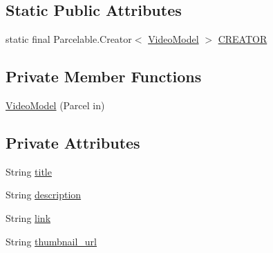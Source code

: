 \subsection*{Static Public Attributes}
\begin{DoxyCompactItemize}
\item 
static final Parcelable.\+Creator$<$ \hyperlink{classorg_1_1buildmlearn_1_1toolkit_1_1videocollectiontemplate_1_1data_1_1VideoModel}{Video\+Model} $>$ \hyperlink{classorg_1_1buildmlearn_1_1toolkit_1_1videocollectiontemplate_1_1data_1_1VideoModel_ac43b05cb32f36a6f4f7b59c63b90873d}{C\+R\+E\+A\+T\+OR}
\end{DoxyCompactItemize}
\subsection*{Private Member Functions}
\begin{DoxyCompactItemize}
\item 
\hyperlink{classorg_1_1buildmlearn_1_1toolkit_1_1videocollectiontemplate_1_1data_1_1VideoModel_a5fe6dbbabecb3c75c2a2f616d06e3715}{Video\+Model} (Parcel in)
\end{DoxyCompactItemize}
\subsection*{Private Attributes}
\begin{DoxyCompactItemize}
\item 
String \hyperlink{classorg_1_1buildmlearn_1_1toolkit_1_1videocollectiontemplate_1_1data_1_1VideoModel_a58bad1c15baf40c7e0f34ba212ef2fc8}{title}
\item 
String \hyperlink{classorg_1_1buildmlearn_1_1toolkit_1_1videocollectiontemplate_1_1data_1_1VideoModel_a85fb57c6d4bd9056a329a5dd5f4d2673}{description}
\item 
String \hyperlink{classorg_1_1buildmlearn_1_1toolkit_1_1videocollectiontemplate_1_1data_1_1VideoModel_afb078347986ac0b3e6c9b53361f3f78c}{link}
\item 
String \hyperlink{classorg_1_1buildmlearn_1_1toolkit_1_1videocollectiontemplate_1_1data_1_1VideoModel_a5bad887870c101bb17b14850fa63d24b}{thumbnail\+\_\+url}
\end{DoxyCompactItemize}

